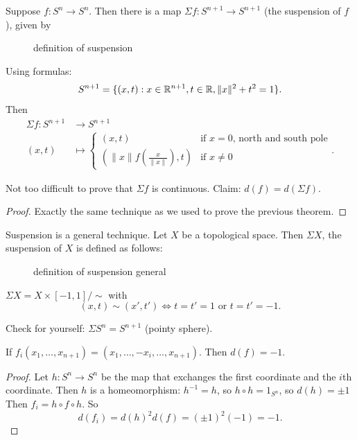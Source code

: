 Suppose $f: S^{n} \to  S^{n}$.
Then there is a map $\Sigma f: S^{n+1} \to  S^{n+1}$ (the suspension of $f$), given by

\begin{figure}[H]
    \centering
    \caption{definition of suspension}
    \label{fig:definition-of-suspension}
\end{figure}

Using formulas: 
\[
    S^{n+1} = \{(x, t) : x \in \mathbb{R}^{n+1}, t \in \mathbb{R}, \|x\|^2 + t^2 = 1\} 
.\] 
Then 
\begin{align*}
    \Sigma f: S^{n+1} &\longrightarrow S^{n+1} \\
    (x, t) &\longmapsto \begin{cases}
        (x, t) & \text{if $x = 0$, north and south pole}\\
        \left(\|x\| f(\frac{x}{\|x\|}), t\right) & \text{if $x \neq 0$}
    \end{cases}
.\end{align*}

Not too difficult to prove that $\Sigma f$ is continuous.
Claim:  $d(f) = d(\Sigma f)$.
\begin{proof}
    Exactly the same technique as we used to prove the previous theorem.
\end{proof}

\begin{remark}
    Suspension is a general technique.
    Let $X$ be a topological space.
    Then $\Sigma X$, the suspension of $X$ is defined as follows:

\begin{figure}[H]
    \centering
    \caption{definition of suspension general}
    \label{fig:definition-of-suspension-general}
\end{figure}

$\Sigma X = X \times [-1, 1] / \sim $ with
\[
    (x, t) \sim  (x', t') \iff t = t' = 1 \text{ or } t = t' = -1
.\] 

Check for yourself: $\Sigma S^{n} = S^{n+1}$ (pointy sphere).
\end{remark}

\begin{corollary}
    If $f_{i}(x_1, \ldots, x_{n+1}) = (x_1, \ldots, -x_i, \ldots, x_{n+1})$.
    Then $d(f) = -1$.
\end{corollary}
\begin{proof}
    Let $h: S^{n} \to  S^{n}$ be the map that exchanges the first coordinate and the $i$th coordinate.
    Then $h$ is a homeomorphism: $h^{-1} = h$, so $h  \circ  h = 1_{S^{n}}$, so $d(h) = \pm 1$
    Then $ f_i = h  \circ  f  \circ  h .$ 
    So
    \[
        d(f_i) = d(h)^2 d(f) = (\pm 1)^2 (-1) = -1
    .\] 
\end{proof}


